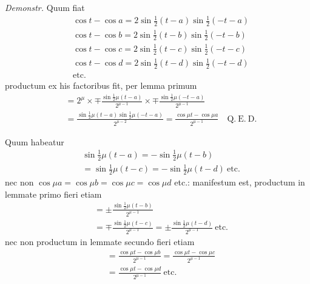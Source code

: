 \emph{Demonstr.} Quum fiat
\[
\begin{aligned}
&\cos t-\cos a=2\sin\frac12(t-a)\sin\frac12(-t-a)\\[5pt]
&\cos t-\cos b=2\sin\frac12(t-b)\sin\frac12(-t-b)\\[5pt]
&\cos t-\cos c=2\sin\frac12(t-c)\sin\frac12(-t-c)\\[5pt]
&\cos t-\cos d=2\sin\frac12(t-d)\sin\frac12(-t-d)\\[5pt]
&\mathrm{etc.}
\end{aligned}
\]
\noindent productum ex his factoribus fit, per lemma primum
\[
\begin{aligned}
&=2^{\mu}\times\mp\frac{\sin\frac12\mu(t-a)}{2^{\mu-1}}\times\mp\frac{\sin\frac12\mu(-t-a)}{2^{\mu-1}}\\[5pt]
&=\frac{\sin\frac12\mu(t-a)\sin\frac12\mu(-t-a)}{2^{\mu-2}}=\frac{\cos\mu t-\cos\mu a}{2^{\mu-1}}\quad\mathrm{Q.\ E.\ D.}
\end{aligned}
\]

Quum habeatur
\[
\begin{aligned}
&\sin\frac12\mu(t-a)=-\sin\frac12\mu(t-b)\\[5pt]&=\sin\frac12\mu(t-c)=-\sin\frac12\mu(t-d)\ \mathrm{etc.}
\end{aligned}
\]
\noindent nec non \(\cos\mu a=\cos\mu b=\cos\mu c=\cos\mu d\) etc.: manifestum est, productum 
in lemmate primo fieri etiam
\[
\begin{aligned}
&=\pm\frac{\sin\frac12\mu(t-b)}{2^{\mu-1}}\\[5pt]&=\mp\frac{\sin\frac12\mu(t-c)}{2^{\mu-1}}=\pm\frac{\sin\frac12\mu(t-d)}{2^{\mu-1}}\ \mathrm{etc.}
\end{aligned}
\]
\noindent nec non productum in lemmate secundo fieri etiam
\[
\begin{aligned}
&=\frac{\cos\mu t-\cos\mu b}{2^{\mu-1}}=\frac{\cos\mu t-\cos\mu c}{2^{\mu-1}}\\[5pt]&=\frac{\cos\mu t-\cos\mu d}{2^{\mu-1}}\ \mathrm{etc.}
\end{aligned}
\]

